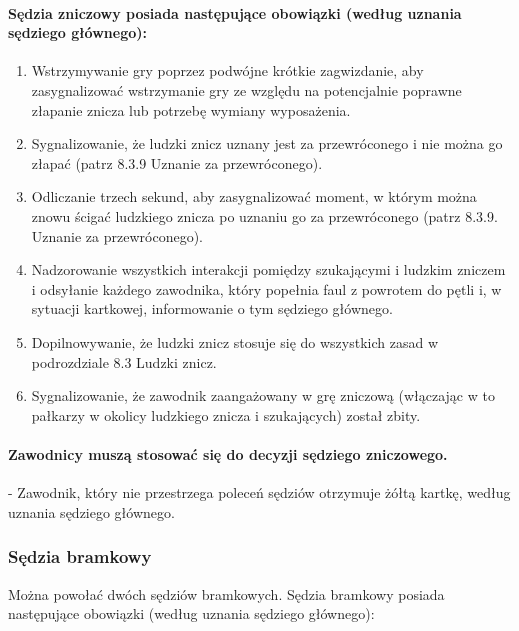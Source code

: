 \documentclass[12pt]{article}
\newcommand\yellowcard{\bgroup\color{yellow}\markoverwith{\textcolor{yellow}{\rule[-0.5ex]{2pt}{0.4pt}}}\ULon}
\begin{document}
\paragraph{Sędzia zniczowy posiada następujące obowiązki (według
	uznania sędziego głównego):}

\begin{enumerate}
	\item Wstrzymywanie gry poprzez podwójne krótkie zagwizdanie, aby
	      zasygnalizować wstrzymanie gry ze względu na potencjalnie poprawne
	      złapanie znicza lub potrzebę wymiany wyposażenia.

	\item Sygnalizowanie, że ludzki znicz uznany jest za przewróconego i nie
	      można go złapać (patrz 8.3.9 Uznanie za przewróconego).

	\item Odliczanie trzech sekund, aby zasygnalizować moment, w którym można
	      znowu ścigać ludzkiego znicza po uznaniu go za przewróconego (patrz
	      8.3.9. Uznanie za przewróconego).

	\item Nadzorowanie wszystkich interakcji pomiędzy szukającymi i ludzkim
	      zniczem i odsyłanie każdego zawodnika, który popełnia faul z powrotem do
	      pętli i, w sytuacji kartkowej, informowanie o tym sędziego głównego.

	\item Dopilnowywanie, że ludzki znicz stosuje się do wszystkich zasad w
	      podrozdziale 8.3 Ludzki znicz.

	\item Sygnalizowanie, że zawodnik zaangażowany w grę zniczową (włączając w
	      to pałkarzy w okolicy ludzkiego znicza i szukających) został zbity.
\end{enumerate}

\paragraph{Zawodnicy muszą stosować się do decyzji sędziego
	zniczowego.}

\yellowcard{Żółta kartka} - Zawodnik, który nie przestrzega poleceń sędziów
otrzymuje żółtą kartkę, według uznania sędziego głównego.

\subsubsection{Sędzia bramkowy}

Można powołać dwóch sędziów bramkowych. Sędzia bramkowy posiada
następujące obowiązki (według uznania sędziego głównego):
\end{document}
